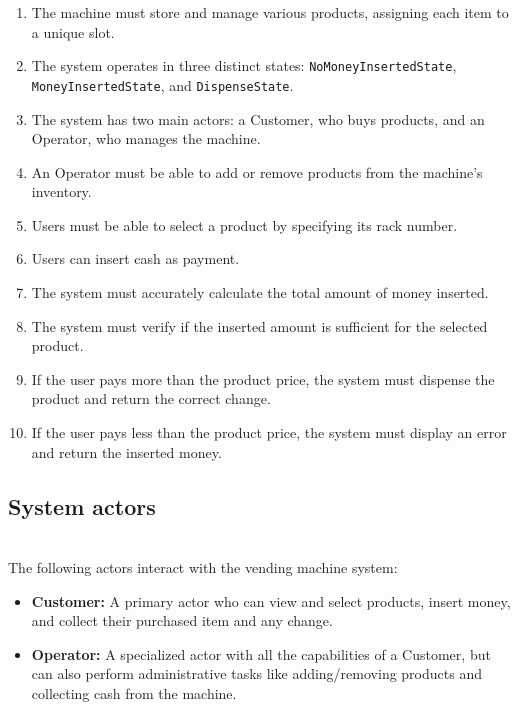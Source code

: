 \begin{enumerate}
\item
\protect{}\label{f7Y9af86sj37-Jhyhp2T1}
The machine must store and manage various products, assigning each item to a unique slot.
\item
\protect{}\label{_PpeaumDEb_Uh7iJ-X9pn}
The system operates in three distinct states: \texttt{NoMoneyInsertedState}, \texttt{MoneyInsertedState}, and \texttt{DispenseState}.
\item
\protect{}\label{XhKKrUwMEIk1jkB4Yte_L}
The system has two main actors: a Customer, who buys products, and an Operator, who manages the machine.
\item
\protect{}\label{0TVOimskkHjQE3sfbDxnX}
An Operator must be able to add or remove products from the machine's inventory.
\item
\protect{}\label{jqB3qBtjs6_cJ54AH_Fnx}
Users must be able to select a product by specifying its rack number.
\item
\protect{}\label{pUlRJdoTvGfYUmd9C7LPQ}
Users can insert cash as payment.
\item
\protect{}\label{n82ixOi4Lge8JgTDY91oX}
The system must accurately calculate the total amount of money inserted.
\item
\protect{}\label{P1nUaRaxGrYBj-lfda-y7}
The system must verify if the inserted amount is sufficient for the selected product.
\item
\protect{}\label{hVO3F6saz8ObU_BJpmXha}
If the user pays more than the product price, the system must dispense the product and return the correct change.
\item
\protect{}\label{pqYYruerLSQEY1uAA0p5f}
If the user pays less than the product price, the system must display an error and return the inserted money.
\end{enumerate}

\subsection{System actors}\label{C1bBcCIycbj5FasxDKIgj}
\\
The following actors interact with the vending machine system:

\begin{itemize}
\item
\protect{}\label{bQJJXQ0cZ_VvYtiC2Ske8}
\textbf{Customer:} A primary actor who can view and select products, insert money, and collect their purchased item and any change.
\item
\protect{}\label{61hLyZTPBB6OuyGM2BERj}
\textbf{Operator:} A specialized actor with all the capabilities of a Customer, but can also perform administrative tasks like adding/removing products and collecting cash from the machine.
\end{itemize}

